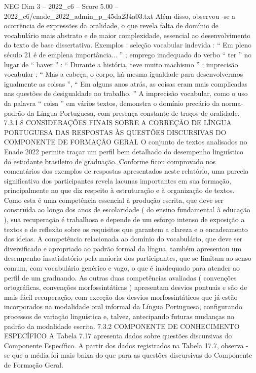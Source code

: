 \begin{textsample}{NEG Dim 3 – 2022\_c6 – Score 5.00 – 2022\_c6/enade\_2022\_admin\_p\_45da234a03.txt}
Além disso, observou -se a ocorrência de expressões da oralidade, o que revela falta de domínio de vocabulário mais abstrato e de maior complexidade, essencial ao desenvolvimento do texto de base dissertativa.
Exemplos : seleção vocabular indevida : “ Em pleno século 21 é de emplena importância... ” ; emprego inadequado do verbo “ ter ” no lugar de “ haver ” : “ Durante a história, teve muito machismo ” ; imprecisão vocabular : “ Mas a cabeça, o corpo, há mesma igualdade para desenvolvermos igualmente as coisas ”, “ Em alguns anos atrás, as coisas eram mais complicadas nas questões de desigualdade no trabalho. ” A imprecisão vocabular, como o uso da palavra “ coisa ” em vários textos, demonstra o domínio precário da norma-padrão da Língua Portuguesa, com presença constante de traços de oralidade. 7.3.1.8 CONSIDERAÇÕES FINAIS SOBRE A CORREÇÃO DE LÍNGUA PORTUGUESA DAS RESPOSTAS ÀS QUESTÕES DISCURSIVAS DO COMPONENTE DE FORMAÇÃO GERAL O conjunto de textos analisados no Enade 2022 permite traçar um perfil bem detalhado do desempenho linguístico do estudante brasileiro de graduação.
Conforme ficou comprovado nos comentários dos exemplos de respostas apresentados neste relatório, uma parcela significativa dos participantes revela lacunas importantes em sua formação, principalmente no que diz respeito à estruturação e à organização de textos.
Como esta é uma competência essencial à produção escrita, que deve ser construída ao longo dos anos de escolaridade ( do ensino fundamental à educação ), sua recuperação é trabalhosa e depende de um esforço intenso de exposição a textos e de reflexão sobre os requisitos que garantem a clareza e o encadeamento das ideias.
A competência relacionada ao domínio do vocabulário, que deve ser diversificado e apropriado ao padrão formal da língua, também apresentou um desempenho insatisfatório pela maioria dos participantes, que se limitam ao senso comum, com vocabulário genérico e vago, o que é inadequado para atender ao perfil de um graduando.
As outras duas competências avaliadas ( convenções ortográficas, convenções morfossintáticas ) apresentam desvios pontuais e são de mais fácil recuperação, com exceção dos desvios morfossintáticos que já estão incorporados na modalidade oral informal da Língua Portuguesa, configurando processos de variação linguística e, talvez, antecipando futuras mudanças no padrão da modalidade escrita. 7.3.2 COMPONENTE DE CONHECIMENTO ESPECÍFICO A Tabela 7.17 apresenta dados sobre questões discursivas do Componente Específico.
A partir dos dados registrados na Tabela 17.7, observa -se que a média foi mais baixa do que para as questões discursivas do Componente de Formação Geral.

\end{textsample}
